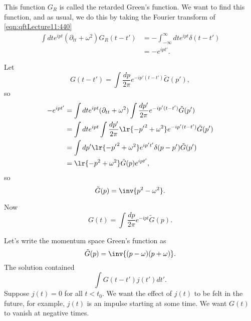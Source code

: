This function \( G_R \) is called the retarded Green's function.  We want to find this function, and as usual, we do this by taking the Fourier transform of \cref{eqn:qftLecture11:440}
\begin{equation}\label{eqn:qftLecture11:480}
\begin{aligned}
\int dt e^{i p t}
(\partial_{tt} + \omega^2) G_R(t - t')
&=
-\int_{-\infty}^\infty dt e^{i p t}
\delta(t - t') \\
&= - e^{i p t'}.
\end{aligned}
\end{equation}

Let
\begin{equation}\label{eqn:qftLecture11:500}
G(t - t')  = \int \frac{dp }{2 \pi} e^{- i p'(t - t')} \tilde{G}(p'),
\end{equation}
so
\begin{equation}\label{eqn:qftLecture11:520}
\begin{aligned}
- e^{i pt'}
&=
\int dt e^{i p t}
(\partial_{tt} + \omega^2)
\int \frac{dp'}{2 \pi} e^{- i p'(t - t')} \tilde{G}(p') \\
&=
\int dt e^{i p t} \int
\frac{dp'}{2 \pi} \lr{ -{p'}^2 + \omega^2 } e^{- i p'(t - t')} \tilde{G}(p') \\
&=
\int dp' \lr{ -{p'}^2 + \omega^2 } e^{i p' t'} \delta(p - p') \tilde{G}(p') \\
&=
\lr{ -{p}^2 + \omega^2 } \tilde{G}(p) e^{i p t'},
\end{aligned}
\end{equation}
so
\begin{equation}\label{eqn:qftLecture11:540}
\tilde{G}(p)
= \inv{p^2 - \omega^2}.
\end{equation}

Now
\begin{equation}\label{eqn:qftLecture11:560}
G(t)
= \int \frac{dp}{2 \pi} e^{-i p t}
\tilde{G}(p).
\end{equation}

Let's write the momentum space Green's function as
\begin{equation}\label{eqn:qftLecture11:580}
\tilde{G}(p)
= \inv{(p - \omega)(p + \omega)}.
\end{equation}
The solution contained
\begin{equation}\label{eqn:qftLecture11:600}
\int G(t - t') j(t') dt'.
\end{equation}
Suppose \( j(t) = 0 \) for all \( t < t_0 \).  We want the effect of \( j(t) \) to be felt in the future, for example, \(j(t) \) is an impulse starting at some time.  We want \( G(t) \) to vanish at negative times.

